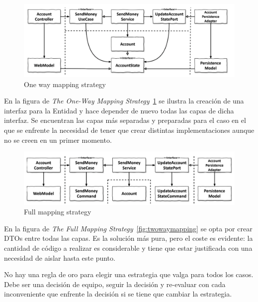 \begin{figure}[H]
    \centering
    \includegraphics[height=0.1\textheight]{./part/Ejecucion/Seguimiento/CreateTaskUseCase/img/onWaymapping}
    \caption{One way mapping strategy~\cite{TomHombergs2019GYHD}}\label{fig:onWaymapping}
\end{figure}

En la figura de \textit{The One-Way Mapping Strategy}~\cref{fig:onWaymapping} se ilustra la creación de una interfaz para la Entidad y hace depender de nuevo todas las capas de dicha interfaz.
Se encuentran las capas más separadas y preparadas para el caso en el que se enfrente la necesidad de tener que crear distintas implementaciones aunque no se creen en un primer momento.

\begin{figure}[H]
    \centering
    \includegraphics[height=0.1\textheight]{./part/Ejecucion/Seguimiento/CreateTaskUseCase/img/fullmapping}
    \caption{Full mapping strategy~\cite{TomHombergs2019GYHD}}\label{fig:fullmapping}
\end{figure}

En la figura de \textit{The Full Mapping Strategy}~\cref{fig:twowaymapping} se opta por crear DTOs entre todas las capas.
Es la solución más pura, pero el coste es evidente: la cantidad de código a realizar es considerable y tiene que estar justificada con una necesidad de aislar hasta este punto.

No hay una regla de oro para elegir una estrategia que valga para todos los casos.
Debe ser una decisión de equipo, seguir la decisión y re-evaluar con cada inconveniente que enfrente la decisión si se tiene que cambiar la estrategia.

